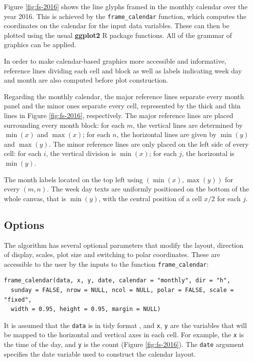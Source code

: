 \documentclass[12pt]{article}
\begin{document}
Figure \ref{fig:fs-2016} shows the line glyphs framed in the monthly calendar over the year 2016. This is achieved by the \texttt{frame\_calendar} function, which computes the coordinates on the calendar for the input data variables. These can then be plotted using the usual \textbf{ggplot2} R package \citep{R-ggplot2} functions. All of the grammar of graphics can be applied.

In order to make calendar-based graphics more accessible and informative, reference lines dividing each cell and block as well as labels indicating week day and month are also computed before plot construction.

Regarding the monthly calendar, the major reference lines separate every month panel and the minor ones separate every cell, represented by the thick and thin lines in Figure \ref{fig:fs-2016}, respectively. The major reference lines are placed surrounding every month block: for each \(m\), the vertical lines are determined by \(\min{(x)}\) and \(\max{(x)}\); for each \(n\), the horizontal lines are given by \(\min{(y)}\) and \(\max{(y)}\). The minor reference lines are only placed on the left side of every cell: for each \(i\), the vertical division is \(\min{(x)}\); for each \(j\), the horizontal is \(\min{(y)}\).

The month labels located on the top left using \((\min{(x)}, \max{(y)})\) for every \((m, n)\). The week day texts are uniformly positioned on the bottom of the whole canvas, that is \(\min{(y)}\), with the central position of a cell \(x / 2\) for each \(j\).

\hypertarget{sec:opt}{%
\subsection{Options}\label{sec:opt}}

The algorithm has several optional parameters that modify the layout, direction of display, scales, plot size and switching to polar coordinates. These are accessible to the user by the inputs to the function \texttt{frame\_calendar}:

\begin{verbatim}
frame_calendar(data, x, y, date, calendar = "monthly", dir = "h", 
  sunday = FALSE, nrow = NULL, ncol = NULL, polar = FALSE, scale = "fixed", 
  width = 0.95, height = 0.95, margin = NULL)
\end{verbatim}

It is assumed that the \texttt{data} is in tidy format \citep{wickham2014tidy}, and \texttt{x}, \texttt{y} are the variables that will be mapped to the horizontal and vertical axes in each cell. For example, the \texttt{x} is the time of the day, and \texttt{y} is the count (Figure \ref{fig:fs-2016}). The \texttt{date} argument specifies the date variable used to construct the calendar layout.
\end{document}
